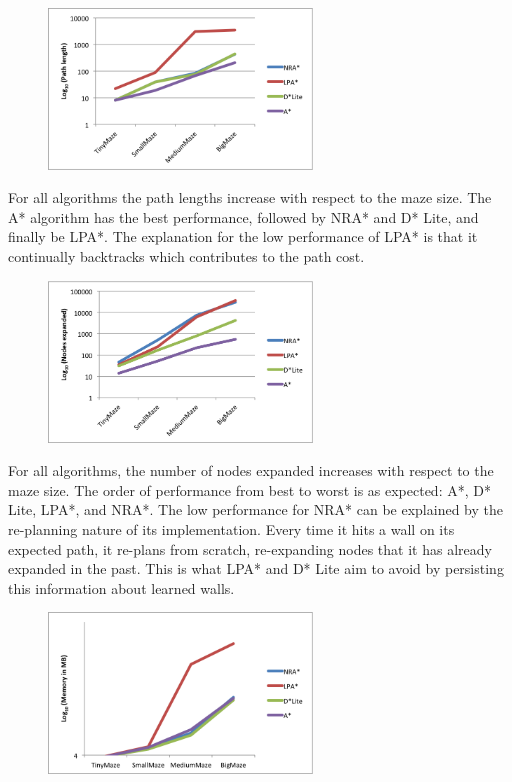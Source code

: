     \begin{figure}[htb!]
    	\centering
    	\includegraphics[width=7cm]{PathLength.png}
    	\caption{}
    	\label{fig:1}
    \end{figure}

	For all algorithms the path lengths increase with respect to the maze size. The A* algorithm has the best performance, followed by NRA* and D* Lite, and finally be LPA*. The explanation for the low performance of LPA* is that it continually backtracks which contributes to the path cost. 

	\begin{figure}[htb!]
		\centering
		\includegraphics[width=7cm]{NodesExpanded.png}
		\caption{}
		\label{fig:2}
	\end{figure}

	For all algorithms, the number of nodes expanded increases with respect to the maze size. The order of performance from best to worst is as expected: A*, D* Lite, LPA*, and NRA*. The low performance for NRA* can be explained by the re-planning nature of its implementation. Every time it hits a wall on its expected path, it re-plans from scratch, re-expanding nodes that it has already expanded in the past. This is what LPA* and D* Lite aim to avoid by persisting this information about learned walls. 

	\begin{figure}[htb!]
		\centering
		\includegraphics[width=7cm]{Memory.png}
		\caption{}
		\label{fig:3}
	\end{figure}


